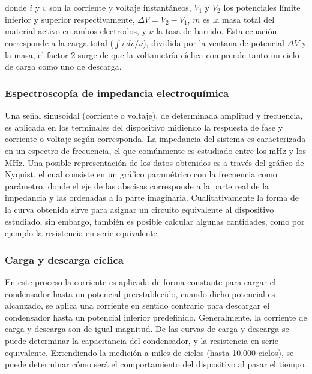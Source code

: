 donde $i$ y $v$ son la corriente y voltaje instantáneos, $V_1$ y $V_2$ los potenciales límite inferior y superior respectivamente, $\Delta V = V_2 - V_1 $, $m$ es la masa total del material activo en ambos electrodos, y $\nu$ la tasa de barrido. Esta ecuación corresponde a la carga total ($\int i\, dv / \nu$), dividida por la ventana de potencial $\Delta V$ y la masa, el factor $2$ surge de que la voltametría cíclica comprende tanto un ciclo de carga como uno de descarga.

\subsubsection{Espectroscopía de impedancia electroquímica}
Una señal sinusoidal (corriente o voltaje), de determinada amplitud y frecuencia, es aplicada en los terminales del dispositivo midiendo la respuesta de fase y corriente o voltaje según corresponda. La impedancia del sistema es caracterizada en un espectro de frecuencia, el que comúnmente es estudiado entre los mHz y los MHz. Una posible representación de los datos obtenidos es a través del gráfico de Nyquist, el cual consiste en un gráfico paramétrico con la frecuencia como parámetro, donde el eje de las abscisas corresponde a la parte real de la impedancia y las ordenadas a la parte imaginaria. Cualitativamente la forma de la curva obtenida sirve para asignar un circuito equivalente al dispositivo estudiado, sin embargo, también es posible calcular algunas cantidades, como por ejemplo la resistencia en serie equivalente.

\subsubsection{Carga y descarga cíclica}
En este proceso la corriente es aplicada de forma constante para cargar el condensador hasta un potencial preestablecido, cuando dicho potencial es alcanzado, se aplica una corriente en sentido contrario para descargar el condensador hasta un potencial inferior predefinido. Generalmente, la corriente de carga y descarga son de igual magnitud. De las curvas de carga y descarga se puede determinar la capacitancia del condensador, y la resistencia en serie equivalente. Extendiendo la medición a miles de ciclos (hasta 10.000 ciclos), se puede determinar cómo será el comportamiento del dispositivo al pasar el tiempo.
